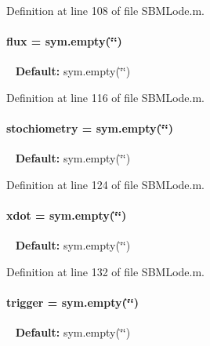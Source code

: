 Definition at line 108 of file S\+B\+M\+Lode.\+m.

\hypertarget{class_s_b_m_lode_a96d7a28b6a4428be15fc1017d19343fa}{}
\paragraph[{flux}]{\setlength{\rightskip}{0pt plus 5cm}flux = sym.\+empty(\char`\"{}\char`\"{})}\label{class_s_b_m_lode_a96d7a28b6a4428be15fc1017d19343fa}
~\newline
{\bfseries Default\+:} sym.\+empty(\char`\"{}\char`\"{}) 

Definition at line 116 of file S\+B\+M\+Lode.\+m.

\hypertarget{class_s_b_m_lode_a8d6dd1568c43b32f1810a5fe9ef6100f}{}
\paragraph[{stochiometry}]{\setlength{\rightskip}{0pt plus 5cm}stochiometry = sym.\+empty(\char`\"{}\char`\"{})}\label{class_s_b_m_lode_a8d6dd1568c43b32f1810a5fe9ef6100f}
~\newline
{\bfseries Default\+:} sym.\+empty(\char`\"{}\char`\"{}) 

Definition at line 124 of file S\+B\+M\+Lode.\+m.

\hypertarget{class_s_b_m_lode_a914ee05b8f01d45602316710ca4b8a43}{}
\paragraph[{xdot}]{\setlength{\rightskip}{0pt plus 5cm}xdot = sym.\+empty(\char`\"{}\char`\"{})}\label{class_s_b_m_lode_a914ee05b8f01d45602316710ca4b8a43}
~\newline
{\bfseries Default\+:} sym.\+empty(\char`\"{}\char`\"{}) 

Definition at line 132 of file S\+B\+M\+Lode.\+m.

\hypertarget{class_s_b_m_lode_ae194cb817eae4085f8023885100c68dd}{}
\paragraph[{trigger}]{\setlength{\rightskip}{0pt plus 5cm}trigger = sym.\+empty(\char`\"{}\char`\"{})}\label{class_s_b_m_lode_ae194cb817eae4085f8023885100c68dd}
~\newline
{\bfseries Default\+:} sym.\+empty(\char`\"{}\char`\"{}) 

